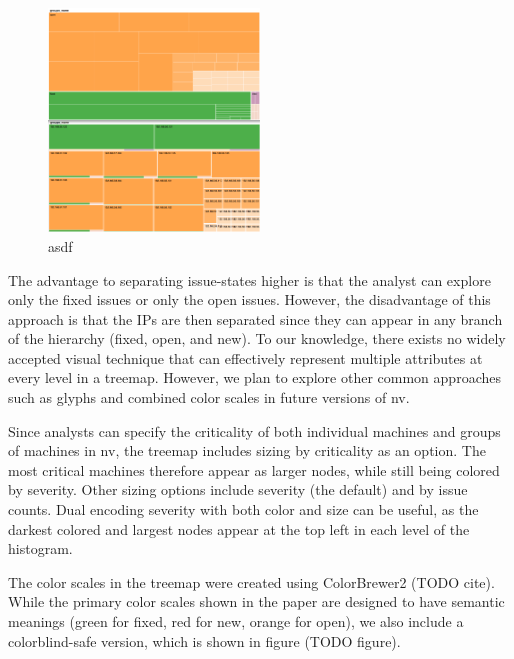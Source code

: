 \documentclass{acm_proc_article-sp}
\begin{document}
\begin{figure}
  \centering
  \includegraphics[width=0.5\textwidth]{../screenshots/state_issue}
  \caption{asdf}
\end{figure}

The advantage to separating issue-states higher is that the analyst can explore only the fixed issues or only the open issues.
However, the disadvantage of this approach is that the IPs are then separated since they can appear in any branch of the hierarchy (fixed, open, and new).
To our knowledge, there exists no widely accepted visual technique that can effectively represent multiple attributes at every level in a treemap.
However, we plan to explore other common approaches such as glyphs and combined color scales in future versions of nv.


Since analysts can specify the criticality of both individual machines and groups of machines in nv, the treemap includes sizing by criticality as an option.
The most critical machines therefore appear as larger nodes, while still being colored by severity.
Other sizing options include severity (the default) and by issue counts.
Dual encoding severity with both color and size can be useful, as the darkest colored and largest nodes appear at the top left in each level of the histogram.

The color scales in the treemap were created using ColorBrewer2 (TODO cite).
While the primary color scales shown in the paper are designed to have semantic meanings (green for fixed, red for new, orange for open), we also include a colorblind-safe version, which is shown in figure (TODO figure).
\end{document}

